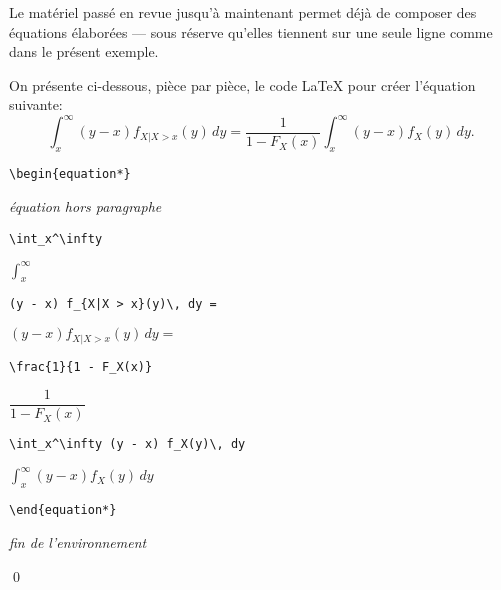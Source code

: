 \begin{exemple}
  Le matériel passé en revue jusqu'à maintenant permet déjà
  de composer des équations élaborées --- sous réserve qu'elles
  tiennent sur une seule ligne comme dans le présent exemple.

  On présente ci-dessous, pièce par pièce, le code {\LaTeX} pour créer
  l'équation suivante:
  \begin{equation*}
    \int_x^\infty (y - x) f_{X|X > x}(y)\, dy =
    \frac{1}{1 - F_X(x)} \int_x^\infty (y - x) f_X(y)\, dy.
  \end{equation*}
  \begin{demo}
    \begin{texample}[0.58\linewidth]
\begin{lstlisting}
\begin{equation*}
\end{lstlisting}
      \producing
      \emph{équation hors paragraphe}
    \end{texample}

    \begin{texample}[0.58\linewidth]
\begin{lstlisting}
\int_x^\infty
\end{lstlisting}
      \producing
      $\displaystyle \int_x^\infty$
    \end{texample}

    \begin{texample}[0.58\linewidth]
\begin{lstlisting}
(y - x) f_{X|X > x}(y)\, dy =
\end{lstlisting}
      \producing
      $(y - x) f_{X|X > x}(y)\, dy =$
    \end{texample}

    \begin{texample}[0.58\linewidth]
\begin{lstlisting}
\frac{1}{1 - F_X(x)}
\end{lstlisting}
      \producing
      $\dfrac{1}{1 - F_X(x)}$
    \end{texample}

    \begin{texample}[0.58\linewidth]
\begin{lstlisting}
\int_x^\infty (y - x) f_X(y)\, dy
\end{lstlisting}
      \producing
      $\displaystyle \int_x^\infty (y - x) f_X(y)\, dy$
    \end{texample}

    \begin{texample}[0.58\linewidth]
\begin{lstlisting}
\end{equation*}
\end{lstlisting}
      \producing
      \emph{fin de l'environnement}
    \end{texample}
  \end{demo}
  \qed
\end{exemple}


